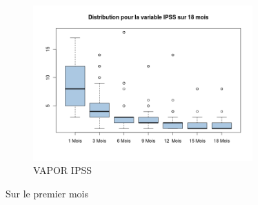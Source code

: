 \begin{figure}[!h]
\centering
\includegraphics[width=0.75\textwidth]{../Fig/VAPOR/vapor-boxplot-post-ipss}
\caption{VAPOR IPSS}
\end{figure}



Sur le premier mois 